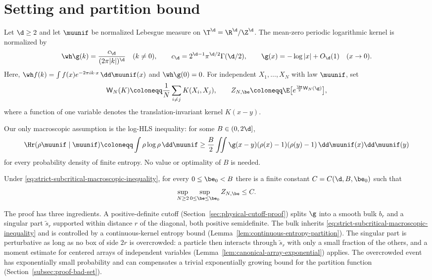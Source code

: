\section{Setting and partition bound}
\label{sec:setting}
Let $\d\ge2$ and let $\muunif$ be normalized Lebesgue measure on $\T^\d=\R^\d/\Z^\d$.  The mean-zero periodic logarithmic kernel is normalized by
\begin{equation}
 \wh\g(k)=\frac{c_\d}{(2\pi|k|)^\d}\quad(k\ne0),
 \qquad c_\d=2^{\d-1}\pi^{\d/2}\Gamma(\d/2),
 \qquad \g(x)=-\log|x|+O_\d(1)
 \quad(x\to0).
 \label{eq:kernel-normalization}
\end{equation}
Here, $\wh f(k)=\int f(x)e^{-2\pi ik\cdot x}\,\dd\muunif(x)$ and $\wh\g(0)=0$.
For independent $X_1,\ldots,X_N$ with law $\muunif$, set
\begin{equation}
 \mathsf W_N(K)\coloneqq\frac1N\sum_{i\ne j}K(X_i,X_j),
 \qquad
 Z_{N,\be}\coloneqq\E\big[e^{\frac\be2\mathsf W_N(\g)}\big],
 \label{eq:homogeneous-partition-function}
\end{equation}
where a function of one variable denotes the translation-invariant kernel $K(x-y)$.

Our only macroscopic assumption is the log-HLS inequality: for some $B\in(0,2\d]$,
\begin{equation}
 \Hr(\rho\muunif\mid\muunif)
 \coloneqq\int\rho\log\rho\,\dd\muunif
 \ge\frac B2\iint\g(x-y)(\rho(x)-1)(\rho(y)-1)
                  \,\dd\muunif(x)\dd\muunif(y)
 \label{eq:strict-subcritical-macroscopic-inequality}
\end{equation}
for every probability density of finite entropy.  No value or optimality of $B$ is needed.

\begin{thm}
\label{thm:principal}
Under \eqref{eq:strict-subcritical-macroscopic-inequality}, for every $0\le\be_0<B$ there is a finite constant $C=C(\d,B,\be_0)$ such that
\begin{equation}
 \sup_{N\ge2}\sup_{0\le\be\le\be_0}Z_{N,\be}\le C.
 \label{eq:principal-order-one}
\end{equation}
\end{thm}

The proof has three ingredients.  A positive-definite cutoff (Section~\ref{sec:physical-cutoff-proof}) splits $\g$ into a smooth bulk $b_r$ and a singular part $\widetilde s_r$ supported within distance $r$ of the diagonal, both positive semidefinite.  The bulk inherits \eqref{eq:strict-subcritical-macroscopic-inequality} and is controlled by a continuous-kernel entropy bound (Lemma~\ref{lem:continuous-entropy-partition}).  The singular part is perturbative as long as no box of side $2r$ is overcrowded: a particle then interacts through $\widetilde s_r$ with only a small fraction of the others, and a moment estimate for centered arrays of independent variables (Lemma~\ref{lem:canonical-array-exponential}) applies.  The overcrowded event has exponentially small probability and can compensates a trivial exponentially growing bound for the partition function (Section~\ref{subsec:proof-bad-set}).

